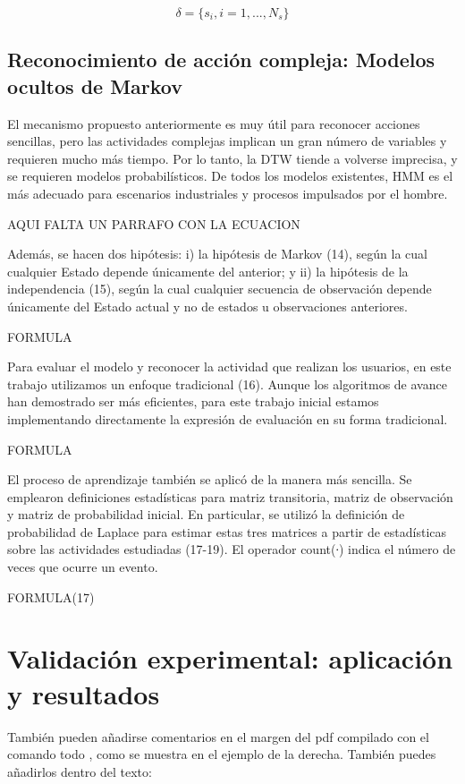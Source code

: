 \documentclass[a4paper]{article}
\begin{document}
\begin{equation}
\delta = \{s_i, i = 1, ..., N_s\}
\end{equation}


\subsection{Reconocimiento de acción compleja: Modelos ocultos de Markov}

El mecanismo propuesto anteriormente es muy útil para reconocer acciones sencillas, pero las actividades complejas implican un gran número de variables y requieren mucho más tiempo. Por lo tanto, la DTW tiende a volverse imprecisa, y se requieren modelos probabilísticos. De todos los modelos existentes, HMM es el más adecuado para escenarios industriales y procesos impulsados por el hombre.

AQUI FALTA UN PARRAFO CON LA ECUACION

Además, se hacen dos hipótesis: i) la hipótesis de Markov (14), según la cual cualquier Estado depende únicamente del anterior; y ii) la hipótesis de la independencia (15), según la cual cualquier secuencia de observación depende únicamente del Estado actual y no de estados u observaciones anteriores.

FORMULA

Para evaluar el modelo y reconocer la actividad que realizan los usuarios, en este trabajo utilizamos un enfoque tradicional (16). Aunque los algoritmos de avance han demostrado ser más eficientes, para este trabajo inicial estamos implementando directamente la expresión de evaluación en su forma tradicional.

FORMULA

El proceso de aprendizaje también se aplicó de la manera más sencilla. Se emplearon definiciones estadísticas para matriz transitoria, matriz de observación y matriz de probabilidad inicial. En particular, se utilizó la definición de probabilidad de Laplace para estimar estas tres matrices a partir de estadísticas sobre las actividades estudiadas (17-19). El operador count(∙) indica el número de veces que ocurre un evento.

FORMULA(17)


\section{Validación experimental: aplicación y resultados}

También pueden añadirse comentarios en el margen del pdf compilado con el comando todo , como se muestra en el ejemplo de la derecha. También puedes añadirlos dentro del texto:
\end{document}
